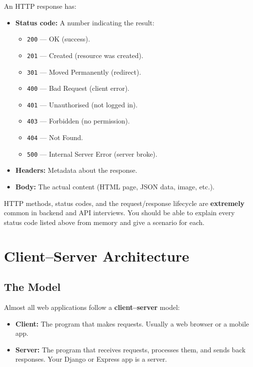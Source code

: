 \documentclass[12pt, a4paper, oneside]{book}
\begin{document}
An HTTP response has:
\begin{itemize}[leftmargin=2em]
    \item \textbf{Status code:} A number indicating the result:
    \begin{itemize}
        \item \texttt{200} — OK (success).
        \item \texttt{201} — Created (resource was created).
        \item \texttt{301} — Moved Permanently (redirect).
        \item \texttt{400} — Bad Request (client error).
        \item \texttt{401} — Unauthorised (not logged in).
        \item \texttt{403} — Forbidden (no permission).
        \item \texttt{404} — Not Found.
        \item \texttt{500} — Internal Server Error (server broke).
    \end{itemize}
    \item \textbf{Headers:} Metadata about the response.
    \item \textbf{Body:} The actual content (HTML page, JSON data, image, etc.).
\end{itemize}

\begin{interviewbox}
HTTP methods, status codes, and the request/response lifecycle are \textbf{extremely} common in backend and API interviews. You should be able to explain every status code listed above from memory and give a scenario for each.
\end{interviewbox}

\section{Client--Server Architecture}

\subsection{The Model}

Almost all web applications follow a \textbf{client--server} model:

\begin{itemize}[leftmargin=2em]
    \item \textbf{Client:} The program that makes requests. Usually a web browser or a mobile app.
    \item \textbf{Server:} The program that receives requests, processes them, and sends back responses. Your Django or Express app is a server.
\end{itemize}
\end{document}
